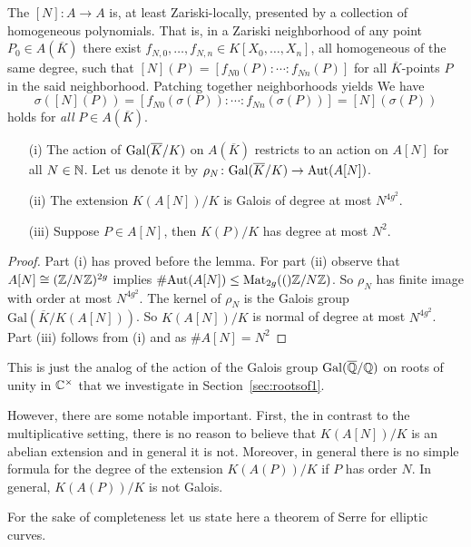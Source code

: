 The $[N]\colon A\rightarrow A$ is, at least Zariski-locally, presented
by a collection of homogeneous polynomials. That is, in a Zariski
neighborhood of any point $P_0\in A(\overline K)$ there exist
$f_{N,0},\ldots,f_{N,n}\in K[X_0,\ldots,X_n]$, all homogeneous of the
same degree, such that 
$[N](P) = [f_{N0}(P):\cdots:f_{Nn}(P)]$ for all $\overline K$-points  $P$ in the said
neighborhood.
Patching together neighborhoods yields
We have
$$\sigma([N](P)) = [f_{N0}(\sigma(P)):\cdots:f_{Nn}(\sigma(P))] =
[N](\sigma(P))$$
holds for \textit{all} $P\in A(\overline K)$.


\begin{lemma}\leavevmode
  \begin{enumerate}
  \item [(i)]
    The
    action of $\mathrm{Gal}(\overline{K}/K)$ on $A(\overline K)$ restricts to an action on
    $A[N]$ for all $N\in{\mathbb{N}}$.
    Let us denote it by
      $\rho_N\colon \mathrm{Gal}(\overline{K}/K)\rightarrow \mathrm{Aut}(A[N])$.
  \item[(ii)]
    The extension $K(A[N])/K$ is Galois
    of degree at most $N^{4g^2}$.
  \item[(iii)] Suppose $P\in A[N]$, then $K(P)/K$ has degree at most
    $N^2$. 
  \end{enumerate}
\end{lemma}
\begin{proof}
  Part (i) has proved before the lemma.  For part (ii) observe that
  $A[N]\cong
  ({\mathbb{Z}}/N{\mathbb{Z}})^{2g}$ implies
  $\#\mathrm{Aut}(A[N])\le {\rm Mat}_{2g}({(}){\mathbb{Z}}/N{\mathbb{Z}})$.
  So  $\rho_N$ has finite image with order at most $N^{4g^2}$. The kernel
  of $\rho_N$ is the Galois group $\mathrm{Gal}(\overline K/K(A[N]))$.
  So $K(A[N])/K$ is normal of degree at most $N^{4g^2}$.
  Part (iii) follows from (i) and as $\#A[N]=N^2$  
\end{proof}

This is just the analog of the action of the Galois group $\mathrm{Gal}({\overline{\mathbb{Q}}}/{\mathbb{Q}})$
on roots of unity in ${\mathbb{C}}^\times$ that we investigate in
Section~\ref{sec:rootsof1}.

However, there are some notable important. First, the in contrast to
the multiplicative setting, there is no reason to believe that
$K(A[N])/K$ is an abelian extension and in general it is not.
Moreover, in general there is no simple formula for the degree of the
extension $K(A(P))/K$ if $P$ has order $N$. In general, $K(A(P))/K$ is
not Galois.

For the sake of completeness let us state here a theorem of Serre for
elliptic curves.

